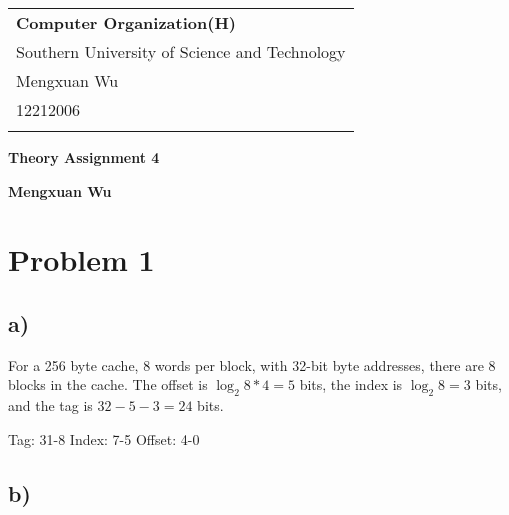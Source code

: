 \documentclass[a4paper,12pt]{article}
\begin{document}
\thispagestyle{empty} %

\begin{tabular}{p{15.5cm}}
{\large \bf Computer Organization(H)} \\
Southern University of Science and Technology \\ Mengxuan Wu \\ 12212006 \\
\hline
\\
\end{tabular}

\vspace*{0.3cm} %

\begin{center}
	{\Large \bf Theory Assignment 4}
	\vspace{2mm}

	{\bf Mengxuan Wu}
		
\end{center}  

\vspace{0.4cm}

\section*{Problem 1}

\subsection*{a)}

For a 256 byte cache, 8 words per block, with 32-bit byte addresses, there are 8 blocks in the cache. 
The offset is $\log_2 8 * 4 = 5$ bits, the index is $\log_2 8 = 3$ bits, and the tag is $32 - 5 - 3 = 24$ bits.

Tag: 31-8
Index: 7-5
Offset: 4-0

\subsection*{b)}
\end{document}
